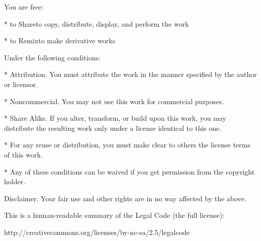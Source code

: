 You are free:

* to Share\dash{}to copy, distribute, display, and perform the work

* to Remix\dash{}to make derivative works

Under the following conditions:

* Attribution. You must attribute the work in the manner specified
by the author or licensor.

* Noncommercial. You may not use this work for commercial
purposes.

* Share Alike. If you alter, transform, or build upon this work,
you may distribute the resulting work only under a license
identical to this one.



* For any reuse or distribution, you must make clear to others the
license terms of this work.

* Any of these conditions can be waived if you get permission from
the copyright holder.

Disclaimer: Your fair use and other rights are in no way affected
by the above.

This is a human-readable summary of the Legal Code (the full
license):

http://creativecommons.org/licenses/by-nc-sa/2.5/legalcode



